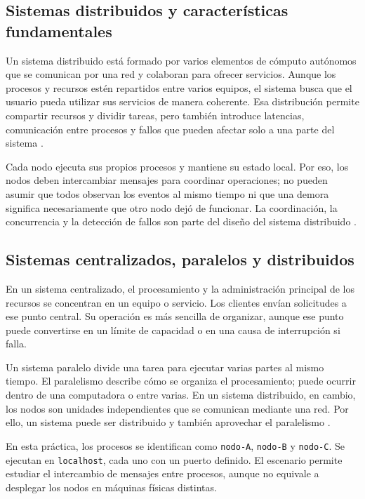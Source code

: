 \subsection{Sistemas distribuidos y características fundamentales}

Un sistema distribuido está formado por varios elementos de cómputo autónomos que se comunican por una red y colaboran para ofrecer servicios. Aunque los procesos y recursos estén repartidos entre varios equipos, el sistema busca que el usuario pueda utilizar sus servicios de manera coherente. Esa distribución permite compartir recursos y dividir tareas, pero también introduce latencias, comunicación entre procesos y fallos que pueden afectar solo a una parte del sistema \cite{vanSteenTanenbaum2023}.

Cada nodo ejecuta sus propios procesos y mantiene su estado local. Por eso, los nodos deben intercambiar mensajes para coordinar operaciones; no pueden asumir que todos observan los eventos al mismo tiempo ni que una demora significa necesariamente que otro nodo dejó de funcionar. La coordinación, la concurrencia y la detección de fallos son parte del diseño del sistema distribuido \cite{vanSteenTanenbaum2023}.

\subsection{Sistemas centralizados, paralelos y distribuidos}

En un sistema centralizado, el procesamiento y la administración principal de los recursos se concentran en un equipo o servicio. Los clientes envían solicitudes a ese punto central. Su operación es más sencilla de organizar, aunque ese punto puede convertirse en un límite de capacidad o en una causa de interrupción si falla.

Un sistema paralelo divide una tarea para ejecutar varias partes al mismo tiempo. El paralelismo describe cómo se organiza el procesamiento; puede ocurrir dentro de una computadora o entre varias. En un sistema distribuido, en cambio, los nodos son unidades independientes que se comunican mediante una red. Por ello, un sistema puede ser distribuido y también aprovechar el paralelismo \cite{vanSteenTanenbaum2023}.

En esta práctica, los procesos se identifican como \texttt{nodo-A}, \texttt{nodo-B} y \texttt{nodo-C}. Se ejecutan en \texttt{localhost}, cada uno con un puerto definido. El escenario permite estudiar el intercambio de mensajes entre procesos, aunque no equivale a desplegar los nodos en máquinas físicas distintas.

